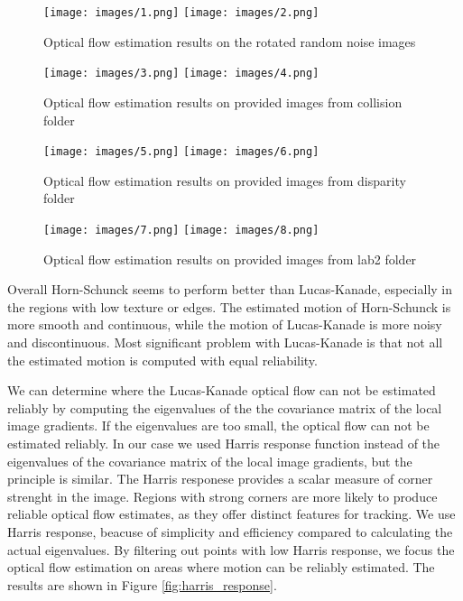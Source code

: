 \documentclass[9pt]{IEEEtran}
\begin{document}
\begin{figure}[htb]
    \centering
    \texttt{[image: images/1.png]}
    \texttt{[image: images/2.png]}
    \caption{Optical flow estimation results on the rotated random noise images}
    \label{fig:random_noise}
\end{figure}
\begin{figure}[htb]
    \centering
    \texttt{[image: images/3.png]}
    \texttt{[image: images/4.png]}
    \caption{Optical flow estimation results on provided images from collision folder}
    \label{fig:collision}
\end{figure}
\begin{figure}[htb]
    \centering
    \texttt{[image: images/5.png]}
    \texttt{[image: images/6.png]}
    \caption{Optical flow estimation results on provided images from disparity folder}
    \label{fig:disparity}
\end{figure}
\begin{figure}[htb]
    \centering
    \texttt{[image: images/7.png]}
    \texttt{[image: images/8.png]}
    \caption{Optical flow estimation results on provided images from lab2 folder}
    \label{fig:lab2}
\end{figure}

Overall Horn-Schunck seems to perform better than Lucas-Kanade, especially in the regions with low texture or edges. The estimated motion of Horn-Schunck is more smooth and continuous, while the motion of Lucas-Kanade is more noisy and discontinuous.
Most significant problem with Lucas-Kanade is that not all the estimated motion is computed with equal reliability.

We can determine where the Lucas-Kanade optical flow can not be estimated reliably by computing the eigenvalues of the the covariance matrix of the local image gradients. If the eigenvalues are too small, the optical flow can not be estimated reliably.
In our case we used Harris response function instead of the eigenvalues of the covariance matrix of the local image gradients, but the principle is similar. The Harris responese provides a scalar measure of corner strenght in the image. Regions with strong corners are more likely to produce reliable optical flow estimates, as they offer distinct features for tracking.
We use Harris response, beacuse of simplicity and efficiency compared to calculating the actual eigenvalues. By filtering out points with low Harris response, we focus the optical flow estimation on areas where motion can be reliably estimated. The results are shown in Figure \ref{fig:harris_response}.
\end{document}
